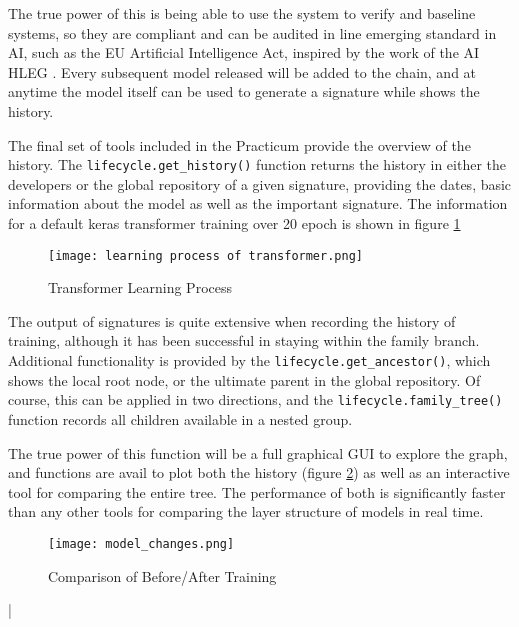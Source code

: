 The true power of this is being able to use the system to verify and baseline systems, so they are compliant and can be audited in line emerging standard in AI, such as the EU Artificial Intelligence Act, inspired by the work of the AI HLEG \cite{high-levelexpertgrouponaiEthicsGuidelinesTrustworthy2019}. Every subsequent model released will be added to the chain, and at anytime the model itself can be used to generate a signature while shows the history.

The final set of tools included in the Practicum provide the overview of the history. The \verb|lifecycle.get_history()| function returns the history in either the developers or the global repository of a given signature, providing the dates, basic information about the model as well as the important signature. The information for a default keras transformer training over 20 epoch is shown in figure \ref{fig:transformer}

\begin{figure}[!ht]
    \centering
    \texttt{[image: learning process of transformer.png]}
    \caption{Transformer Learning Process}
    \label{fig:transformer}
\end{figure}

The output of signatures is quite extensive when recording the history of training, although it has been successful in staying within the family branch. Additional functionality is provided by the \verb|lifecycle.get_ancestor()|, which shows the local root node, or the ultimate parent in the global repository. Of course, this can be applied in two directions, and the \verb|lifecycle.family_tree()| function records all children available in a nested group.


The true power of this function will be a full graphical GUI to explore the graph, and functions are avail to plot both the history (figure \ref{fig:beforeafter}) as well as an interactive tool for comparing the entire tree. The performance of both is significantly faster than any other tools for comparing the layer structure of models in real time.

\begin{figure}[!h]
    \centering
    \texttt{[image: model\_changes.png]}
    \caption{Comparison of Before/After Training}
    \label{fig:beforeafter}
\end{figure}|







